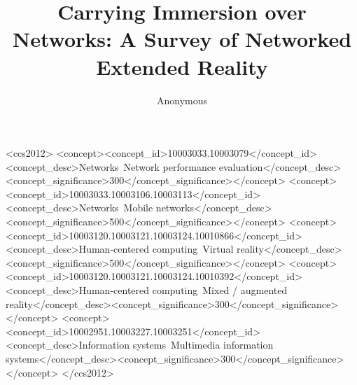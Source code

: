 \documentclass[acmsmall,screen]{acmart}
\begin{document}
\title{Carrying Immersion over Networks: A Survey of Networked Extended Reality}

\author{Anonymous}



\begin{CCSXML}
<ccs2012>
<concept><concept_id>10003033.10003079</concept_id><concept_desc>Networks~Network performance evaluation</concept_desc><concept_significance>300</concept_significance></concept>
<concept><concept_id>10003033.10003106.10003113</concept_id><concept_desc>Networks~Mobile networks</concept_desc><concept_significance>500</concept_significance></concept>
<concept><concept_id>10003120.10003121.10003124.10010866</concept_id><concept_desc>Human-centered computing~Virtual reality</concept_desc><concept_significance>500</concept_significance></concept>
<concept><concept_id>10003120.10003121.10003124.10010392</concept_id><concept_desc>Human-centered computing~Mixed / augmented reality</concept_desc><concept_significance>300</concept_significance></concept>
<concept><concept_id>10002951.10003227.10003251</concept_id><concept_desc>Information systems~Multimedia information systems</concept_desc><concept_significance>300</concept_significance></concept>
</ccs2012>
\end{CCSXML}


\maketitle















\end{document}

